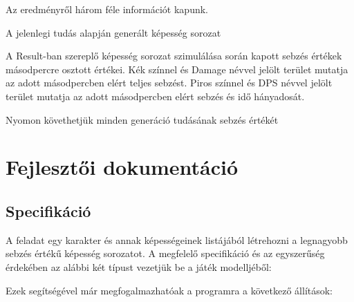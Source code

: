 \documentclass[12pt]{article}
\begin{document}
Az eredményről három féle információt kapunk. 

\begin{description}[align=left,labelwidth=3cm]
	\item [Result] A jelenlegi tudás alapján generált képesség sorozat
	\item [Bal grafikon] A Result-ban szereplő képesség sorozat szimulálása során kapott sebzés értékek másodpercre osztott értékei. Kék színnel és Damage névvel jelölt terület mutatja az adott másodpercben elért teljes sebzést. Piros színnel és DPS névvel jelölt terület mutatja az adott másodpercben elért sebzés és idő hányadosát.
	\item [Jobb grafikon] Nyomon követhetjük minden generáció tudásának sebzés értékét
\end{description}

\section{Fejlesztői dokumentáció}

\subsection{Specifikáció}

A feladat egy karakter és annak képességeinek listájából létrehozni a legnagyobb sebzés értékű képesség sorozatot. A megfelelő specifikáció és az egyszerűség érdekében az alábbi két típust vezetjük be a játék modelljéből:

\vspace{1.5em}
\noindent{}
\vspace{1em}

Ezek segítségével már megfogalmazhatóak a programra a következő állítások:

\vspace{1cm}
\noindent{} \vspace{1em}
\end{document}
